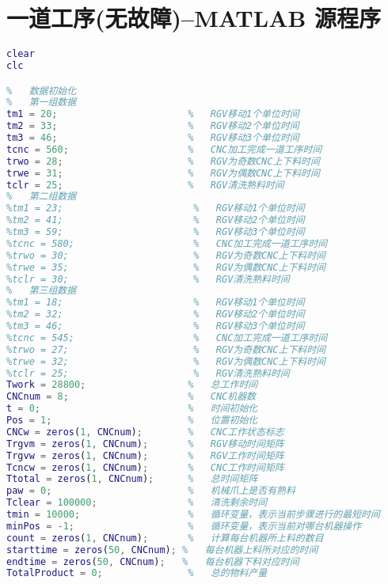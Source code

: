 \documentclass[no-math,withoutpreface,bwprint]{cumcmthesis} %
\numberwithin{equation}{section}
\numberwithin{figure}{section}
\numberwithin{table}{section}
\begin{document}
\section{ 一道工序(无故障)--MATLAB 源程序}
\begin{lstlisting}[language=matlab]
%   初始化MATLAB
clear
clc

%   数据初始化
%   第一组数据
tm1 = 20;                       %   RGV移动1个单位时间
tm2 = 33;                       %   RGV移动2个单位时间
tm3 = 46;                       %   RGV移动3个单位时间
tcnc = 560;                     %   CNC加工完成一道工序时间
trwo = 28;                      %   RGV为奇数CNC上下料时间
trwe = 31;                      %   RGV为偶数CNC上下料时间
tclr = 25;                      %   RGV清洗熟料时间
%   第二组数据
%tm1 = 23;                       %   RGV移动1个单位时间
%tm2 = 41;                       %   RGV移动2个单位时间
%tm3 = 59;                       %   RGV移动3个单位时间
%tcnc = 580;                     %   CNC加工完成一道工序时间
%trwo = 30;                      %   RGV为奇数CNC上下料时间
%trwe = 35;                      %   RGV为偶数CNC上下料时间
%tclr = 30;                      %   RGV清洗熟料时间
%   第三组数据
%tm1 = 18;                       %   RGV移动1个单位时间
%tm2 = 32;                       %   RGV移动2个单位时间
%tm3 = 46;                       %   RGV移动3个单位时间
%tcnc = 545;                     %   CNC加工完成一道工序时间
%trwo = 27;                      %   RGV为奇数CNC上下料时间
%trwe = 32;                      %   RGV为偶数CNC上下料时间
%tclr = 25;                      %   RGV清洗熟料时间
Twork = 28800;                  %   总工作时间
CNCnum = 8;                     %   CNC机器数
t = 0;                          %   时间初始化
Pos = 1;                        %   位置初始化
CNCw = zeros(1, CNCnum);        %   CNC工作状态标志
Trgvm = zeros(1, CNCnum);       %   RGV移动时间矩阵
Trgvw = zeros(1, CNCnum);       %   RGV工作时间矩阵
Tcncw = zeros(1, CNCnum);       %   CNC工作时间矩阵
Ttotal = zeros(1, CNCnum);      %   总时间矩阵
paw = 0;                        %   机械爪上是否有熟料
Tclear = 100000;                %   清洗剩余时间
tmin = 10000;                   %   循环变量，表示当前步骤进行的最短时间
minPos = -1;                    %   循环变量，表示当前对哪台机器操作
count = zeros(1, CNCnum);       %   计算每台机器所上料的数目
starttime = zeros(50, CNCnum); %   每台机器上料所对应的时间
endtime = zeros(50, CNCnum);   %   每台机器下料对应时间
TotalProduct = 0;               %   总的物料产量


\end{lstlisting}
\end{document}
